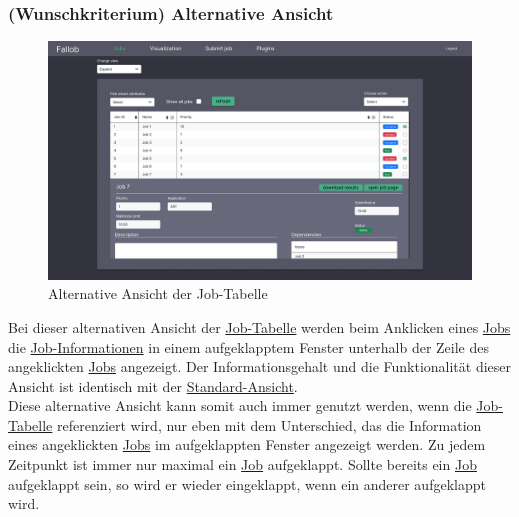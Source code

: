 \subsubsection{(Wunschkriterium) Alternative Ansicht}
\label{pages:job-table-alt}
\begin{figure}[H]
    \label{fig:job-table-exp}
    \includegraphics[width=\textwidth]{images-interface/v5_interface/job_table_expanded_5.pdf}
    \caption{Alternative Ansicht der Job-Tabelle}
\end{figure}
Bei dieser alternativen Ansicht der \hyperref[pages:job-table]{Job-Tabelle} werden beim Anklicken eines \hyperref[B:Jobs]{Jobs} die \hyperref[B:Job-Informationen]{Job-Informationen} in einem aufgeklapptem Fenster unterhalb der Zeile des angeklickten \hyperref[B:Jobs]{Jobs} angezeigt. Der Informationsgehalt und die Funktionalität dieser Ansicht ist identisch mit der  \hyperref[pages:job-table-default]{Standard-Ansicht}. \\
Diese alternative Ansicht kann somit auch immer genutzt werden, wenn die \hyperref[pages:job-table]{Job-Tabelle} referenziert wird, nur eben mit dem Unterschied, das die Information eines angeklickten \hyperref[B:Jobs]{Jobs} im aufgeklappten Fenster angezeigt werden.
Zu jedem Zeitpunkt ist immer nur maximal ein \hyperref[B:Jobs]{Job} aufgeklappt. Sollte bereits ein \hyperref[B:Jobs]{Job} aufgeklappt sein, so wird er wieder eingeklappt, wenn ein anderer aufgeklappt wird.\\



\newpage
